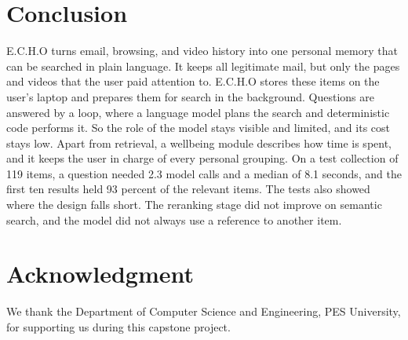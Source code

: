 \documentclass[conference]{IEEEtran}
\begin{document}
\section{Conclusion}\label{sec:conc}
E.C.H.O turns email, browsing, and video history into one personal memory that can be searched in plain language. It keeps all legitimate mail, but only the pages and videos that the user paid attention to. E.C.H.O stores these items on the user's laptop and prepares them for search in the background. Questions are answered by a loop, where a language model plans the search and deterministic code performs it. So the role of the model stays visible and limited, and its cost stays low. Apart from retrieval, a wellbeing module describes how time is spent, and it keeps the user in charge of every personal grouping. On a test collection of 119 items, a question needed 2.3 model calls and a median of 8.1 seconds, and the first ten results held 93 percent of the relevant items. The tests also showed where the design falls short. The reranking stage did not improve on semantic search, and the model did not always use a reference to another item.

\section*{Acknowledgment}
We thank the Department of Computer Science and Engineering, PES University, for supporting us during this capstone project.
\end{document}
